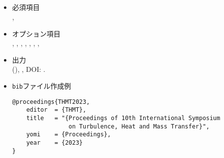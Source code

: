 \documentclass[a4paper,fleqn,uplatex,dvipdfmx]{jsarticle}
\begin{document}
\subsection{\ttproceedings}
\label{ssec:proceedings}
\begin{tcolorbox}[enhanced, title=\ttproceedings, drop fuzzy shadow]
    \begin{itemize}
        \item 必須項目 \\
        \tttitle, \ttyear
        \item オプション項目 \\
        \tteditor, \ttorganization, \ttpublisher, \ttaddress, \ttmonth, \ttnote, \ttkey, \ttdoi
        \item 出力 \\
            \colorbox[gray]{0.8}{\tttitle} (\colorbox[gray]{0.8}{\ttyear}), \colorbox[gray]{0.8}{\ttnote}, DOI: \colorbox[gray]{0.8}{\ttdoi}.
        \item \verb|bib|ファイル作成例 \vspace{-3mm}
\begin{verbatim}
@proceedings{THMT2023,
    editor  = {THMT},
    title   = "{Proceedings of 10th International Symposium 
                on Turbulence, Heat and Mass Transfer}",
    yomi    = {Proceedings},
    year    = {2023}
}
\end{verbatim}
    \end{itemize}
\end{tcolorbox}
\end{document}
